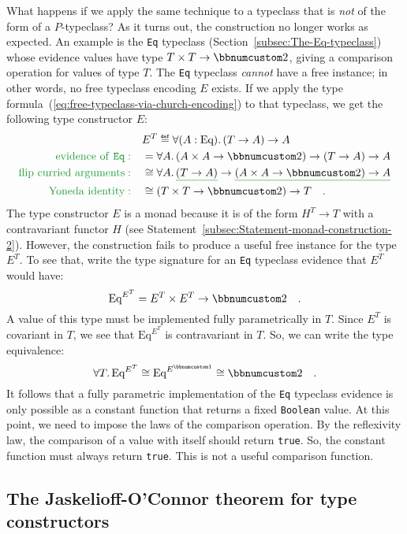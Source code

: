 What happens if we apply the same technique to a typeclass that is
\emph{not} of the form of a $P$-typeclass? As it turns out, the construction
no longer works as expected. An example is the \lstinline!Eq! typeclass
(Section~\ref{subsec:The-Eq-typeclass}) whose evidence values have
type $T\times T\rightarrow\bbnum 2$, giving a comparison operation
for values of type $T$. The \lstinline!Eq! typeclass \emph{cannot}
have a free instance; in other words, no free typeclass encoding $E$
exists. If we apply the type formula~(\ref{eq:free-typeclass-via-church-encoding})
to that typeclass, we get the following type constructor $E$:
\begin{align*}
 & E^{T}\triangleq\forall(A:\text{Eq}).\,(T\rightarrow A)\rightarrow A\\
{\color{greenunder}\text{evidence of \texttt{Eq}}:}\quad & =\forall A.\,(A\times A\rightarrow\bbnum 2)\rightarrow(T\rightarrow A)\rightarrow A\\
{\color{greenunder}\text{flip curried arguments}:}\quad & \cong\forall A.\,\gunderline{(T\rightarrow A)}\rightarrow\gunderline{(A\times A\rightarrow\bbnum 2)\rightarrow A}\\
{\color{greenunder}\text{Yoneda identity}:}\quad & \cong(T\times T\rightarrow\bbnum 2)\rightarrow T\quad.
\end{align*}
The type constructor $E$ is a monad because it is of the form $H^{T}\rightarrow T$
with a contravariant functor $H$ (see Statement~\ref{subsec:Statement-monad-construction-2}).
However, the construction fails to produce a useful free instance
for the type $E^{T}$. To see that, write the type signature for an
\lstinline!Eq! typeclass evidence that $E^{T}$ would have:
\[
\text{Eq}^{E^{T}}=E^{T}\times E^{T}\rightarrow\bbnum 2\quad.
\]
A value of this type must be implemented fully parametrically in $T$.
Since $E^{T}$ is covariant in $T$, we see that $\text{Eq}^{E^{T}}$
is contravariant in $T$. So, we can write the type equivalence:
\[
\forall T.\,\text{Eq}^{E^{T}}\cong\text{Eq}^{E^{\bbnum 1}}\cong\bbnum 2\quad.
\]
It follows that a fully parametric implementation of the \lstinline!Eq!
typeclass evidence is only possible as a constant function that returns
a fixed \lstinline!Boolean! value. At this point, we need to impose
the laws of the comparison operation. By the reflexivity law,
the comparison of a value with itself should return \lstinline!true!.
So, the constant function must always return \lstinline!true!. This
is not a useful comparison function.

\subsection{The Jaskelioff-O\textsf{'}Connor theorem for type constructors}

